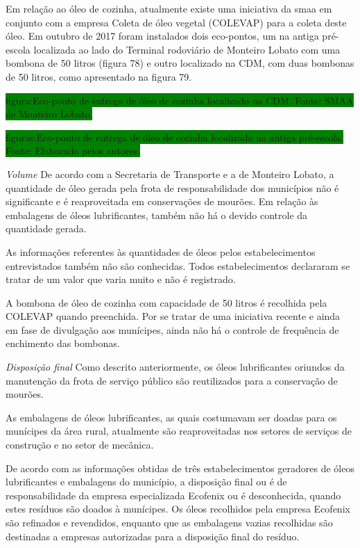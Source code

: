 \begin{description}
	
	
	Em relação ao óleo de cozinha, atualmente existe uma iniciativa da \gls{smaa} em conjunto com a empresa Coleta de óleo vegetal (COLEVAP) para a coleta deste óleo. Em outubro de 2017 foram instalados dois eco-pontos, um na antiga pré-escola localizada ao lado do Terminal rodoviário de Monteiro Lobato com uma bombona de 50 litros (figura 78) e outro localizado na CDM, com duas bombonas de 50 litros, como apresentado na figura 79.
	
	\colorbox{green}{figura:Eco-ponto de entrega de óleo de cozinha localizado na CDM. Fonte: SMAA de Monteiro Lobato.}
	
	\colorbox{green}{figuras:Eco-ponto de entrega de óleo de cozinha localizada na antiga pré-escola. Fonte: Elaborado pelos autores.}
	
	\subitem \textit{Volume} 
	De acordo com a Secretaria de Transporte e a  de Monteiro Lobato, a quantidade de óleo gerada pela frota de responsabilidade dos municípios não é significante e é reaproveitada em conservações de mourões. Em relação às embalagens de óleos lubrificantes, também não há o devido controle da quantidade gerada.
	
	As informações referentes às quantidades de óleos pelos estabelecimentos entrevistados também não são conhecidas. Todos estabelecimentos declararam se tratar de um valor que varia muito e não é registrado.
	
	A bombona de óleo de cozinha com capacidade de 50 litros é recolhida pela COLEVAP quando preenchida. Por se tratar de uma iniciativa recente e ainda em fase de divulgação aos munícipes, ainda não há o controle de frequência de enchimento das bombonas.
	
		\subitem \textit{Disposição final}
		Como descrito anteriormente, os óleos lubrificantes oriundos da manutenção da frota de serviço público são reutilizados para a conservação de mourões. 
	
	As embalagens de óleos lubrificantes, as quais costumavam ser doadas para os munícipes da área rural, atualmente são reaproveitadas nos setores de serviços de construção e no setor de mecânica.
	
	De acordo com as informações obtidas de três estabelecimentos geradores de óleos lubrificantes e embalagens do município, a disposição final ou é de responsabilidade da empresa especializada Ecofenix ou é desconhecida, quando estes resíduos são doados à munícipes. Os óleos recolhidos pela empresa Ecofenix são refinados e revendidos, enquanto que as embalagens vazias recolhidas são destinadas a empresas autorizadas para a disposição final do resíduo.
	

\end{description}
